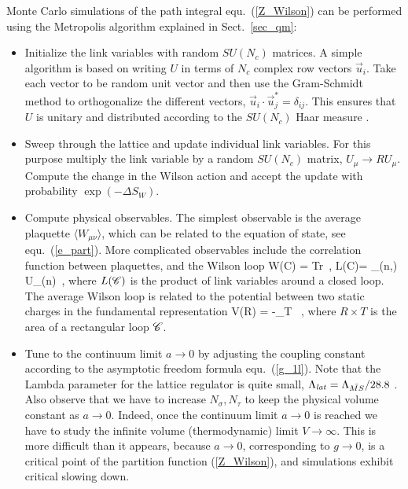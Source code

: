  Monte Carlo simulations of the path integral equ.~(\ref{Z_Wilson}) can 
be performed using the Metropolis algorithm  explained in 
Sect.~\ref{sec_qm}:

\begin{itemize}
\item Initialize the link variables with random
$SU(N_c)$ matrices. A simple algorithm is based on writing $U$
in terms of $N_c$ complex row vectors $\vec{u}_i$. Take each vector
to be random unit vector and then use the Gram-Schmidt method to 
orthogonalize the different vectors, $\vec{u}_i\cdot\vec{u}_j^*
=\delta_{ij}$. This ensures that $U$ is unitary and distributed
according to the $SU(N_c)$ Haar measure \cite{Mezzadri:2006}.

\item Sweep through the lattice and update individual link variables. 
For this purpose multiply the link variable by a random $SU(N_c)$
matrix, $U_\mu\to R U_\mu$. Compute the change in the Wilson action 
and accept the update with probability $\exp(-\Delta S_W)$. 

\item Compute physical observables. The simplest observable is the 
average plaquette $\langle W_{\mu\nu}\rangle$, which can be related
to the equation of state, see equ.~(\ref{e_part}). More complicated
observables include the correlation function between plaquettes, and 
the Wilson loop
\be 
W({\cal C}) = Tr \, , 
\hspace{0.5cm}
L({\cal C})= \prod_{(n,\mu)} U_\mu(n)\, , 
\ee
where $L({\cal C})$ is the product of link variables around a closed
loop. The average Wilson loop is related to the potential between
two static charges in the fundamental representation
\be 
 V(R) = -\lim_{T\to\infty} 
    \log {}\, ,
\ee
where $R\times T$ is the area of a rectangular loop ${\cal C}$. 

\item Tune to the continuum limit $a\to 0$ by adjusting the coupling 
constant according to the asymptotic freedom formula equ.~(\ref{g_1l}). 
Note that the Lambda parameter for the lattice regulator is quite small, 
$\Lambda_{\it lat} = \Lambda_{\bar{MS}}/28.8$ \cite{Hasenfratz:1980kn}. 
Also observe that we have to increase $N_\sigma,N_\tau$ to keep the 
physical volume constant as $a\to 0$. Indeed, once the continuum limit
$a\to 0$ is reached we have to study the infinite volume (thermodynamic)
limit $V\to \infty$. This is more difficult than it appears, because 
$a\to 0$, corresponding to $g\to 0$, is a critical point of the 
partition function (\ref{Z_Wilson}), and simulations exhibit critical 
slowing down. 

\end{itemize}

